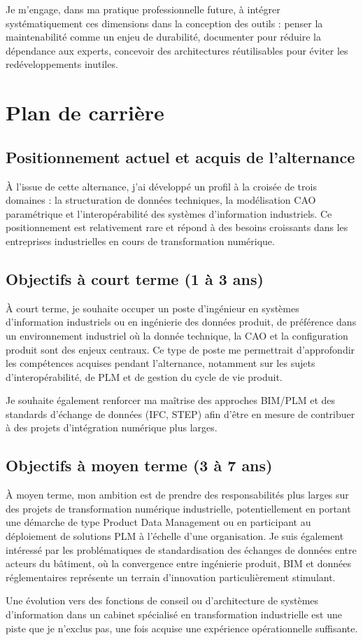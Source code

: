 Je m'engage, dans ma pratique professionnelle future, à intégrer systématiquement ces dimensions dans la conception des outils : penser la maintenabilité comme un enjeu de durabilité, documenter pour réduire la dépendance aux experts, concevoir des architectures réutilisables pour éviter les redéveloppements inutiles.

\section{Plan de carrière}

\subsection{Positionnement actuel et acquis de l'alternance}

À l'issue de cette alternance, j'ai développé un profil à la croisée de trois domaines : la structuration de données techniques, la modélisation CAO paramétrique et l'interopérabilité des systèmes d'information industriels. Ce positionnement est relativement rare et répond à des besoins croissants dans les entreprises industrielles en cours de transformation numérique.

\subsection{Objectifs à court terme (1 à 3 ans)}

À court terme, je souhaite occuper un poste d'ingénieur en systèmes d'information industriels ou en ingénierie des données produit, de préférence dans un environnement industriel où la donnée technique, la CAO et la configuration produit sont des enjeux centraux. Ce type de poste me permettrait d'approfondir les compétences acquises pendant l'alternance, notamment sur les sujets d'interopérabilité, de PLM et de gestion du cycle de vie produit.

Je souhaite également renforcer ma maîtrise des approches BIM/PLM et des standards d'échange de données (IFC, STEP) afin d'être en mesure de contribuer à des projets d'intégration numérique plus larges.

\subsection{Objectifs à moyen terme (3 à 7 ans)}

À moyen terme, mon ambition est de prendre des responsabilités plus larges sur des projets de transformation numérique industrielle, potentiellement en portant une démarche de type Product Data Management ou en participant au déploiement de solutions PLM à l'échelle d'une organisation. Je suis également intéressé par les problématiques de standardisation des échanges de données entre acteurs du bâtiment, où la convergence entre ingénierie produit, BIM et données réglementaires représente un terrain d'innovation particulièrement stimulant.

Une évolution vers des fonctions de conseil ou d'architecture de systèmes d'information dans un cabinet spécialisé en transformation industrielle est une piste que je n'exclus pas, une fois acquise une expérience opérationnelle suffisante.
